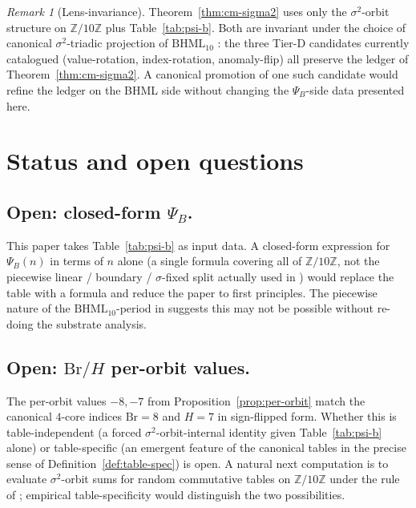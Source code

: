 \documentclass[11pt,reqno]{amsart}
\theoremstyle{plain}
\theoremstyle{definition}
\theoremstyle{remark}
\newtheorem*{remark}{Remark}
\newcommand{\Z}{\mathbb{Z}}
\newcommand{\BH}{\mathrm{BHML}}
\newcommand{\sig}{\sigma}
\begin{document}
\begin{remark}[Lens-invariance]
Theorem~\ref{thm:cm-sigma2} uses only the $\sig^{2}$-orbit structure on
$\Z/10\Z$ plus Table~\ref{tab:psi-b}.  Both are invariant under the
choice of canonical $\sig^{2}$-triadic projection of $\BH_{10}$
\cite{Atlas2026Tiering}: the three Tier-D candidates currently
catalogued (value-rotation, index-rotation, anomaly-flip) all preserve
the ledger of Theorem~\ref{thm:cm-sigma2}.  A canonical promotion of
one such candidate would refine the ledger on the BHML side without
changing the $\Psi_B$-side data presented here.
\end{remark}

\section{Status and open questions}
\label{sec:open}

\subsection{Open: closed-form $\Psi_B$.}
This paper takes Table~\ref{tab:psi-b} as input data.  A closed-form
expression for $\Psi_B(n)$ in terms of $n$ alone (a single formula
covering all of $\Z/10\Z$, not the piecewise linear / boundary /
$\sig$-fixed split actually used in \cite{SandersBridgeWP9}) would
replace the table with a formula and reduce the paper to first
principles.  The piecewise nature of the $\BH_{10}$-period in
\cite{SandersBridgeWP9} suggests this may not be possible without
re-doing the substrate analysis.

\subsection{Open: $\mathrm{Br}/H$ per-orbit values.}
The per-orbit values $-8, -7$ from Proposition~\ref{prop:per-orbit}
match the canonical $4$-core indices $\mathrm{Br} = 8$ and $H = 7$ in
sign-flipped form.  Whether this is table-independent (a forced
$\sig^{2}$-orbit-internal identity given Table~\ref{tab:psi-b}
alone) or table-specific (an emergent feature of the canonical tables
in the precise sense of Definition~\ref{def:table-spec}) is open.
A natural next computation is to evaluate $\sig^{2}$-orbit sums for
random commutative tables on $\Z/10\Z$ under the rule of
\cite[\S 5]{SandersBridgeWP9}; empirical
table-specificity would distinguish the two possibilities.
\end{document}
